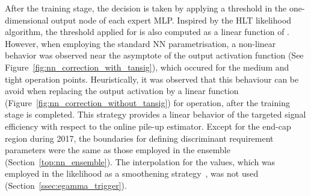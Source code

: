 After the training stage, the decision is taken by applying a threshold in the
one-dimensional output node of each expert MLP.\@ 
Inspired by the HLT likelihood algorithm, the threshold applied for
\rnn is also computed as a linear function of \avgmu{}.
However, when employing the standard NN parametrisation, a non-linear
behavior was observed near the asymptote of the output activation 
function (See Figure~\ref{fig:nn_correction_with_tansig}), which occured
for the medium and tight operation points. Heuristically, it was 
observed that this behaviour can be avoid when replacing the output
activation by a linear function (Figure~\ref{fig:nn_correction_without_tansig})
for operation, after the training stage is completed.
This strategy provides a linear
behavior of the targeted signal efficiency with respect to the online pile-up
estimator. Except for the end-cap region during 2017, the boundaries for
defining discriminant requirement parameters were the same as those employed in
the \rnn ensemble (Section~\ref{top:nn_ensemble}). The 
interpolation for the \et{} values, which was employed in the likelihood as a smoothening strategy~\cite{aaboud2019electron}, was
not used (Section~\ref{ssec:egamma_trigger}).



